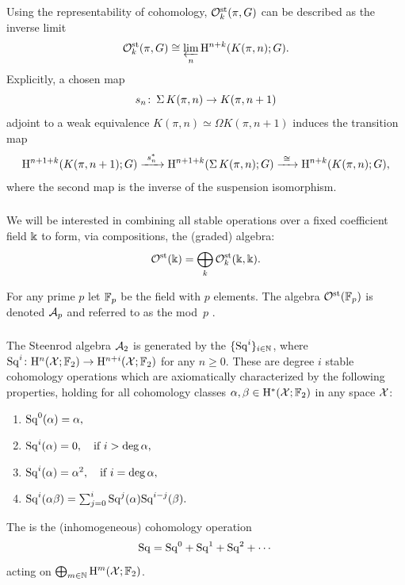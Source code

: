 Using the representability of cohomology, \(\mathcal{O}^{\mathrm{st}}_k(\pi, G)\) can be described as the inverse limit
\[
\mathcal{O}^{\mathrm{st}}_k(\pi, G) \cong \varprojlim_n \mathrm{H}^{n+k}(K(\pi, n); G).
\]
Explicitly, a chosen map
\[
s_n \colon \operatorname{\Sigma} K(\pi, n) \to K(\pi, n+1)
\]
adjoint to a weak equivalence \(K(\pi, n) \simeq \Omega K(\pi, n+1)\) induces the transition map
\[
\rH^{n+1+k}(K(\pi, n+1); G) \xrightarrow{\ s_n^*\ } \rH^{n+1+k}(\sus K(\pi, n); G) \xrightarrow{\ \cong\ } \rH^{n+k}(K(\pi, n); G),
\]
where the second map is the inverse of the suspension isomorphism.

\subsubsection{}

We will be interested in combining all stable operations over a fixed coefficient field $\Bbbk$ to form, via compositions, the (graded) algebra:
\[
\mathcal{O}^{\mathrm{st}}(\Bbbk) = \bigoplus_k \mathcal{O}^{\mathrm{st}}_k(\Bbbk, \Bbbk).
\]

For any prime $p$ let \({\mathbb{F}_p}\) be the field with \(p\) elements.
The algebra $\mathcal{O}^{\mathrm{st}}({\mathbb{F}_p})$ is denoted $\mathcal{A}_p$ and referred to as the mod~$p$ .

\subsubsection{}

The Steenrod algebra $\mathcal{A}_2$ is generated by the  $\{\mathrm{Sq}^i\}_{i \in \mathbb{N}}$, where $\mathrm{Sq}^i \colon \mathrm{H}^n(\mathcal{X}; {\mathbb{F}_2}) \to \mathrm{H}^{n+i}(\mathcal{X}; {\mathbb{F}_2})$ for any $n\geq 0$.
These are degree $i$ stable cohomology operations which are axiomatically characterized by the following properties, holding for all cohomology classes $\alpha,\beta \in \mathrm{H}^*(\mathcal{X}; {\mathbb{F}_2})$ in any space $\mathcal{X}$:
\begin{enumerate}
	\item \(\mathrm{Sq}^0(\alpha) = \alpha,\)
	\item \(\mathrm{Sq}^i(\alpha) = 0, \quad \text{if } i > \deg\alpha,\)
	\item \(\mathrm{Sq}^i(\alpha) = \alpha^2, \quad \text{if } i = \deg\alpha,\)
	\item \(\mathrm{Sq}^i(\alpha \beta) = \textstyle\sum_{j=0}^{i} \mathrm{Sq}^j(\alpha) \mathrm{Sq}^{i-j}(\beta).\)
\end{enumerate}

The  is the (inhomogeneous) cohomology operation
\[
\mathrm{Sq} = \mathrm{Sq}^0 + \mathrm{Sq}^1 + \mathrm{Sq}^2 + \dotsb
\]
acting on \(\bigoplus_{m \in \mathbb{N}} \mathrm{H}^m(\mathcal{X}; {\mathbb{F}_2})\).

